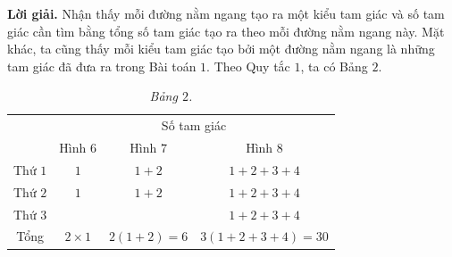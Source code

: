 	\begin{figure}[H]
		\centering
		\vspace*{-5pt}
		\captionsetup{labelformat= empty, justification=centering}
		\captionsetup[subfigure]{labelformat=empty}
		\hfill{}
		\hfill
		\hfill
		\hfill
		\vspace*{-10pt}
	\end{figure}    
	\textbf{\color{toancuabi}Lời giải.} Nhận thấy mỗi đường nằm ngang tạo ra một kiểu tam giác và số tam giác cần tìm bằng tổng số tam giác tạo ra theo mỗi đường nằm ngang này. Mặt khác, ta cũng thấy mỗi kiểu tam giác tạo bởi một đường nằm ngang là những tam giác đã đưa ra trong Bài toán $1$.
	\vskip 0.1cm
	Theo Quy tắc $1$, ta có Bảng $2$.
\begin{table}[H]
	\vspace*{-5pt}
\centering
\begin{tabular}{|c|c|c|c|}
	\hline
	\multirow{2}{5em}{\centering{Đường nằm ngang}}&\multicolumn{3}{c|}{Số tam giác}\\
	\cline{2-4}
	&Hình $6$&Hình $7$&Hình $8$\\
	\hline
	Thứ $1$ & $1$ &$1+2$& $1+2+3+4$\\
	\hline
	Thứ $2$ &$1$&$1+2$&$1+2+3+4$\\
	\hline
	Thứ $3$ &  & & $1+2+3+4$\\
	\hline
	Tổng &$2\times 1$ &$2(1+2)=6$&$3(1+2+3+4) = 30$\\
	\hline
\end{tabular}
\captionsetup{labelformat= empty, justification=centering}
\caption{\textit{\color{toancuabi}Bảng $2$.}}
\vspace*{-5pt}
\end{table}
